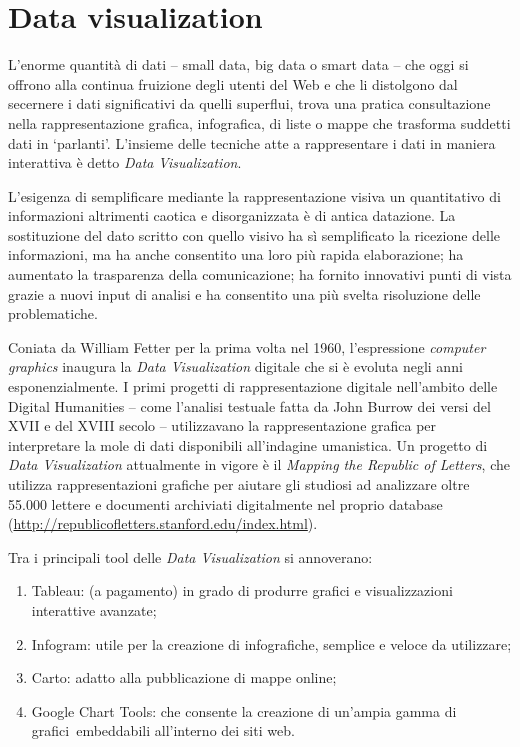 
\chapter{Data visualization}

L'enorme quantità di dati -- small data, big data o smart data -- che
oggi si offrono alla continua fruizione degli utenti del Web e che li
distolgono dal secernere i dati significativi da quelli superflui, trova
una pratica consultazione nella rappresentazione grafica, infografica,
di liste o mappe che trasforma suddetti dati in `parlanti'. L'insieme
delle tecniche atte a rappresentare i dati in maniera interattiva è
detto \emph{Data} \emph{Visualization}.

L'esigenza di semplificare mediante la rappresentazione visiva un
quantitativo di informazioni altrimenti caotica e disorganizzata è di
antica datazione. La sostituzione del dato scritto con quello visivo ha
sì semplificato la ricezione delle informazioni, ma ha anche consentito
una loro più rapida elaborazione; ha aumentato la trasparenza della
comunicazione; ha fornito innovativi punti di vista grazie a nuovi input
di analisi e ha consentito una più svelta risoluzione delle
problematiche.

Coniata da William Fetter per la prima volta nel 1960, l'espressione
\emph{computer} \emph{graphics} inaugura la \emph{Data Visualization}
digitale che si è evoluta negli anni esponenzialmente. I primi progetti
di rappresentazione digitale nell'ambito delle Digital Humanities --
come l'analisi testuale fatta da John Burrow dei versi del XVII e del
XVIII secolo -- utilizzavano la rappresentazione grafica per
interpretare la mole di dati disponibili all'indagine umanistica. Un
progetto di \emph{Data Visualization} attualmente in vigore è il
\emph{Mapping the Republic of Letters}, che utilizza rappresentazioni
grafiche per aiutare gli studiosi ad analizzare oltre 55.000 lettere e
documenti archiviati digitalmente nel proprio database
(\url{http://republicofletters.stanford.edu/index.html}).

Tra i principali tool delle \emph{Data Visualization} si annoverano:

\begin{enumerate}
\def\labelenumi{\arabic{enumi}.}
\item
  Tableau: (a pagamento) in grado di produrre grafici e visualizzazioni
  interattive avanzate;
\item
  Infogram: utile per la creazione di infografiche, semplice e veloce da
  utilizzare;
\item
  Carto: adatto alla pubblicazione di mappe online;
\item
  Google Chart Tools: che consente la creazione di un'ampia gamma di
  grafici~embeddabili all'interno dei siti web.
\end{enumerate}


